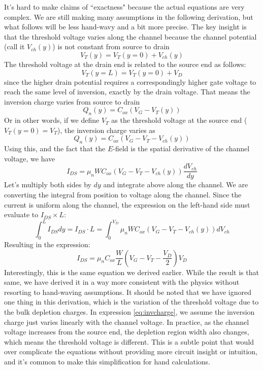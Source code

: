 It's hard to make claims of ``exactness" because the actual equations are very complex.  We are still making many assumptions in the following derivation, but what follows will be less hand-wavy and a bit more precise.  The key insight is that the threshold voltage varies along the channel because the channel potential (call it $V_{ch}(y)$) is not constant from source to drain
%
\begin{equation} 
	V_T(y) = V_T(y= 0 ) + V_{ch}(y) 
\end{equation}
%
The threshold voltage at the drain end is related to the source end as follows:
%
\begin{equation} 
	V_T(y=L) = V_T(y = 0) + V_D 
\end{equation} 
%
since the higher drain potential requires a correspondingly higher gate voltage to reach the same level of inversion, exactly by the drain voltage.  That means the inversion charge varies from source to drain 
%
\begin{equation} 
	Q_n(y) = C_{ox} (V_G - V_T(y)) 
\end{equation}
%
Or in other words, if we define $V_T$ as the threshold voltage at the source end ($V_T(y=0) = V_{T}$), the inversion charge varies as
%
\begin{equation} 
	Q_n(y) = C_{ox} (V_G - V_T - V_{ch}(y) )  \label{eq:invcharge}
\end{equation}
%
%
Using this, and the fact that the $E$-field is the spatial derivative of the channel voltage, we have
%
\begin{equation} 
	I_{DS} = \mu_n W C_{ox} \left(V_G - V_T - V_{ch}(y) \right) \frac{dV_{ch}}{dy} 
\end{equation}
%
Let's multiply both sides by $dy$ and integrate above along the channel.  We are converting the integral from position to voltage along the channel.  Since the current is uniform along the channel, the expression on the left-hand side must evaluate to $I_{DS} \times L$:
%
\begin{equation} 
	\int_0^L I_{DS} dy = I_{DS} \cdot L = \int_0^{V_D} \mu_n W C_{ox} (V_G - V_T - V_{ch}(y)) dV_{ch} 
\end{equation}
%
Resulting in the expression:
\begin{equation} 
	I_{DS} = \mu_n C_{ox} \frac{W}{L} \left( V_G - V_T - \frac{V_D}{2} \right) V_D 
\end{equation}
%
Interestingly, this is the same equation we derived earlier.  While the result is that same, we have derived it in a way more consistent with the physics without resorting to hand-waving assumptions.  It should be noted that we have ignored one thing in this derivation, which is the variation of the threshold voltage due to the bulk depletion charges.  In expression \ref{eq:invcharge}, we assume the inversion charge just varies linearly with the channel voltage. In practice, as the channel voltage increases from the source end, the depletion region width also changes, which means the threshold voltage is different. This is a subtle point that would over complicate the equations without providing more circuit insight or intuition, and it's common to make this simplification for hand calculations.

